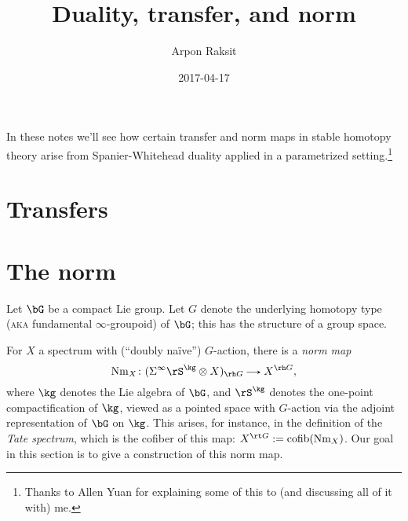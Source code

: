 


\title{Duality, transfer, and norm}
\author{Arpon Raksit}
\date{2017-04-17}



\maketitle

\newcommand{\BG}{{\rB G}}
\newcommand{\hG}{{\rh G}}
\newcommand{\Loc}{\operatorname{Loc}}
\newcommand{\Nm}{\operatorname{Nm}}
\newcommand{\Spaces}{\mathrm{Spaces}}
\newcommand{\Spectra}{\mathrm{Spectra}}
\newcommand{\tG}{{\rt G}}


In these notes we'll see how certain transfer and norm maps in stable homotopy theory arise from Spanier-Whitehead duality applied in a parametrized setting.\footnote{Thanks to Allen Yuan for explaining some of this to (and discussing all of it with) me.}


\section{Transfers}


\section{The norm}
\label{norm}

\begin{notation}
  \label{norm-setup}
  Let $\bG$ be a compact Lie group. Let $G$ denote the underlying homotopy type (\textsc{aka} fundamental $\infty$-groupoid) of $\bG$; this has the structure of a group space.
\end{notation}

\begin{nothing}
  \label{norm-goal}
  For $X$ a spectrum with (``doubly na\"ive'') $G$-action, there is a \emph{norm map}
  \[
    \Nm_X \c (\Sigma^\infty\rS^\kg \otimes X)_{\hG} \to X^\hG,
  \]
  where $\kg$ denotes the Lie algebra of $\bG$, and $\rS^\kg$ denotes the one-point compactification of $\kg$, viewed as a pointed space with $G$-action via the adjoint representation of $\bG$ on $\kg$. This arises, for instance, in the definition of the \emph{Tate spectrum}, which is the cofiber of this map: $X^\tG \ce \cofib(\Nm_X)$. Our goal in this section is to give a construction of this norm map.
\end{nothing}

